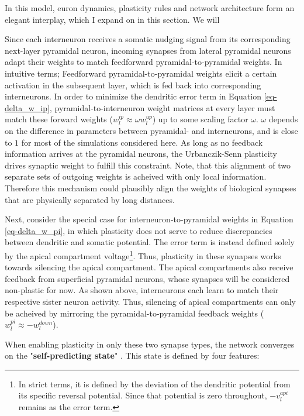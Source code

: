 In this model, euron dynamics, plasticity rules and network architecture form an elegant interplay, which I expand on
 in this section. We will

Since each interneuron receives a somatic nudging signal from its corresponding next-layer pyramidal neuron, incoming
synapses from lateral pyramidal neurons adapt their weights to match feedforward pyramidal-to-pyramidal weights. In
intuitive terms; Feedforward pyramidal-to-pyramidal weights elicit a certain activation in the subsequent layer, which
is fed back into corresponding interneurons. In order to minimize the dendritic error term in Equation
\ref{eq-delta_w_ip}, pyramidal-to-interneuron weight matrices at every layer must match these forward weights ($w_l^{ip}
\approx \omega w_l^{up}$) up to some scaling factor $\omega$. $\omega$ depends on the difference in parameters between
pyramidal- and interneurons, and is close to $1$ for most of the simulations considered here. As long as no feedback
information arrives at the pyramidal neurons, the Urbanczik-Senn plasticity drives synaptic weight to fulfill this
constraint. Note, that this alignment of two separate sets of outgoing weights is acheived with only local information.
Therefore this mechanism could plausibly align the weights of biological synapses that are physically separated by long
distances. \newline

Next, consider the special case for interneuron-to-pyramidal weights in Equation \ref{eq-delta_w_pi}, in which
plasticity does not serve to reduce discrepancies between dendritic and somatic potential. The error term is instead
defined solely by the apical compartment voltage\footnote{In strict terms, it is defined by the deviation of the
dendritic potential from its specific reversal potential. Since that potential is zero throughout, $- v_l^{api}$ remains
as the error term.}. Thus, plasticity in these synapses works towards silencing the apical compartment. The apical
compartments also receive feedback from superficial pyramidal neurons, whose synapses will be considered non-plastic for now.
As shown above, interneurons each learn to match their respective sister neuron activity. Thus, silencing of apical compartments can
only be acheived by mirroring the pyramidal-to-pyramidal feedback weights ($w_l^{pi} \approx -w_l^{down}$).\newline

When enabling plasticity in only these two synapse types, the network converges on the "\textbf{self-predicting
  state}" \citep{sacramento2018dendritic}. This state is defined by four features: 
  
